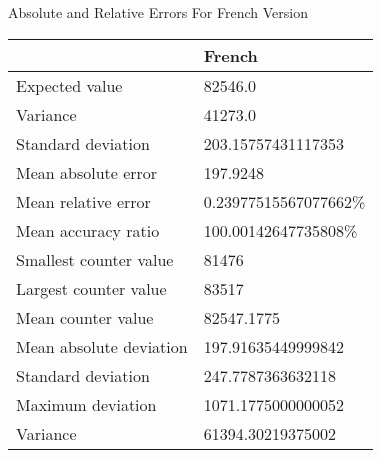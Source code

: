 \documentclass[]{revdetua}
\begin{document}
\begin{table}[!ht]
    \centering
    Absolute and Relative Errors For French Version\linebreak\linebreak
    \begin{tabular}{|l|l|}
    \hline
        ~ & French \\ \hline
        Expected value & 82546.0 \\ \hline
        Variance & 41273.0 \\ \hline
        Standard deviation & 203.15757431117353 \\ \hline
        Mean absolute error & 197.9248 \\ \hline
        Mean relative error & 0.23977515567077662\% \\ \hline
        Mean accuracy ratio & 100.00142647735808\% \\ \hline
        Smallest counter value & 81476 \\ \hline
        Largest counter value & 83517 \\ \hline
        Mean counter value & 82547.1775 \\ \hline
        Mean absolute deviation & 197.91635449999842 \\ \hline
        Standard deviation & 247.7787363632118 \\ \hline
        Maximum deviation & 1071.1775000000052 \\ \hline
        Variance & 61394.30219375002 \\ \hline
    \end{tabular}
\end{table}
\end{document}
